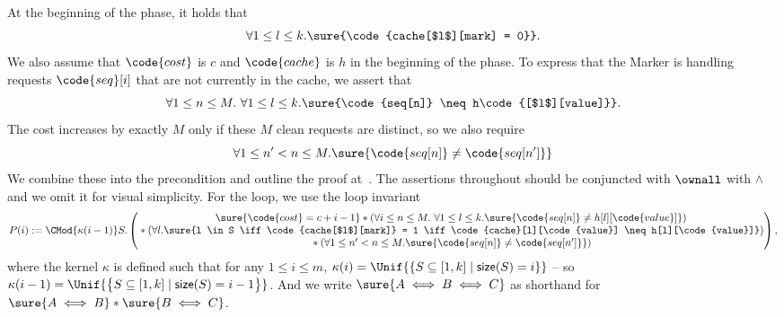 At the beginning of the phase,
it holds that
\[
  \forall 1 \leq l \leq k. \sure{\code{cache[$l$][mark] = 0}}.
\]
We also assume that $\code{cost}$ is $c$ and $\code{cache}$ is $h$ in the beginning
of the phase.
To express that the Marker is handling requests $\code{seq}[i]$ that are not currently in the cache,
we assert that
\[
\forall 1 \leq n \leq M.\  \forall 1 \leq l \leq k. \sure{\code{seq[n]} \neq h\code{[$l$][value]}}.
\]
The cost increases by exactly $M$ only if these $M$ clean requests are distinct,
so we also require
\[
  \forall 1 \leq n' < n \leq M. \sure{\code{seq[n]} \neq \code{seq[n']}}
\]
We combine these into the precondition and outline the proof at~.
The assertions throughout should be conjuncted with $\ownall$ with $\land$ and
we omit it for visual simplicity.
For the loop, we use the loop invariant
\[
  P(i) :=
  \CMod{\kappa(i-1)} S.
        \begin{pmatrix}
             \sure{\code{cost} = c + i - 1}
           \ast \left( \forall i \leq n \leq M.\  \forall 1 \leq l \leq k. \sure{\code{seq[n]} \neq h[l][\code{value}]} \right) \\
             {} \ast \left( \forall l. \sure{l \in S \iff \code{cache[$l$][mark]} = 1 \iff \code{cache}[l][\code{value}] \neq h[l][\code{value}]} \right) \\
             {} \ast \left( \forall 1 \leq n' < n \leq M. \sure{\code{seq[n]} \neq \code{seq[n']}} \right)\\
        \end{pmatrix},
\]
where the kernel $\kappa$ is defined such that for any $1 \leq i \leq m$,
$\kappa(i) = \Unif{\{S \subseteq [1, k] \mid \textsf{size}(S) = i\}}$ --
so $\kappa(i- 1) = \Unif{\big\{S \subseteq [1, k] \mid \textsf{size}(S) = i - 1 \big\}}$.
And we write $\sure{A \iff B \iff C}$
as shorthand for $\sure{A \iff B} \ast \sure{B \iff C}$.

